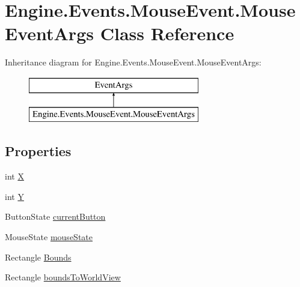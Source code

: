 \hypertarget{a00374}{}\section{Engine.\+Events.\+Mouse\+Event.\+Mouse\+Event\+Args Class Reference}
\label{a00374}
Inheritance diagram for Engine.\+Events.\+Mouse\+Event.\+Mouse\+Event\+Args\+:\begin{figure}[H]
\begin{center}
\leavevmode
\includegraphics[height=2.000000cm]{d5/db5/a00374}
\end{center}
\end{figure}
\subsection*{Properties}
\begin{DoxyCompactItemize}
\item 
int \hyperlink{a00374_a175240a0014c598ad4d3daa2c1ab2a52}{X}
\item 
int \hyperlink{a00374_aeb28044ee25cb17021a05179d2bdf2cf}{Y}
\item 
Button\+State \hyperlink{a00374_ade52d4638272eb8342e036b3d0fd6dc7}{current\+Button}
\item 
Mouse\+State \hyperlink{a00374_ae98190023f0a49b913faddf08e76b75a}{mouse\+State}
\item 
Rectangle \hyperlink{a00374_a3f65de8a63ad6d5135dd71c181cb0fc4}{Bounds}
\item 
Rectangle \hyperlink{a00374_abb545612ce32e2f770e0c199193a28a1}{bounds\+To\+World\+View}
\end{DoxyCompactItemize}



